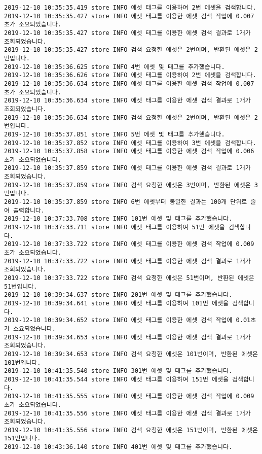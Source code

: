 \begin{Verbatim}[fontsize=\tiny, breaklines=true, breakanywhere=true]
2019-12-10 10:35:35.419 store INFO 에셋 태그를 이용하여 2번 에셋을 검색합니다.
2019-12-10 10:35:35.427 store INFO 에셋 태그를 이용한 에셋 검색 작업에 0.007초가 소요되었습니다.
2019-12-10 10:35:35.427 store INFO 에셋 태그를 이용한 에셋 검색 결과로 1개가 조회되었습니다.
2019-12-10 10:35:35.427 store INFO 검색 요청한 에셋은 2번이며, 반환된 에셋은 2번입니다.
2019-12-10 10:35:36.625 store INFO 4번 에셋 및 태그를 추가했습니다.
2019-12-10 10:35:36.626 store INFO 에셋 태그를 이용하여 2번 에셋을 검색합니다.
2019-12-10 10:35:36.634 store INFO 에셋 태그를 이용한 에셋 검색 작업에 0.007초가 소요되었습니다.
2019-12-10 10:35:36.634 store INFO 에셋 태그를 이용한 에셋 검색 결과로 1개가 조회되었습니다.
2019-12-10 10:35:36.634 store INFO 검색 요청한 에셋은 2번이며, 반환된 에셋은 2번입니다.
2019-12-10 10:35:37.851 store INFO 5번 에셋 및 태그를 추가했습니다.
2019-12-10 10:35:37.852 store INFO 에셋 태그를 이용하여 3번 에셋을 검색합니다.
2019-12-10 10:35:37.858 store INFO 에셋 태그를 이용한 에셋 검색 작업에 0.006초가 소요되었습니다.
2019-12-10 10:35:37.859 store INFO 에셋 태그를 이용한 에셋 검색 결과로 1개가 조회되었습니다.
2019-12-10 10:35:37.859 store INFO 검색 요청한 에셋은 3번이며, 반환된 에셋은 3번입니다.
2019-12-10 10:35:37.859 store INFO 6번 에셋부터 동일한 결과는 100개 단위로 줄여 출력합니다.
2019-12-10 10:37:33.708 store INFO 101번 에셋 및 태그를 추가했습니다.
2019-12-10 10:37:33.711 store INFO 에셋 태그를 이용하여 51번 에셋을 검색합니다.
2019-12-10 10:37:33.722 store INFO 에셋 태그를 이용한 에셋 검색 작업에 0.009초가 소요되었습니다.
2019-12-10 10:37:33.722 store INFO 에셋 태그를 이용한 에셋 검색 결과로 1개가 조회되었습니다.
2019-12-10 10:37:33.722 store INFO 검색 요청한 에셋은 51번이며, 반환된 에셋은 51번입니다.
2019-12-10 10:39:34.637 store INFO 201번 에셋 및 태그를 추가했습니다.
2019-12-10 10:39:34.641 store INFO 에셋 태그를 이용하여 101번 에셋을 검색합니다.
2019-12-10 10:39:34.652 store INFO 에셋 태그를 이용한 에셋 검색 작업에 0.01초가 소요되었습니다.
2019-12-10 10:39:34.653 store INFO 에셋 태그를 이용한 에셋 검색 결과로 1개가 조회되었습니다.
2019-12-10 10:39:34.653 store INFO 검색 요청한 에셋은 101번이며, 반환된 에셋은 101번입니다.
2019-12-10 10:41:35.540 store INFO 301번 에셋 및 태그를 추가했습니다.
2019-12-10 10:41:35.544 store INFO 에셋 태그를 이용하여 151번 에셋을 검색합니다.
2019-12-10 10:41:35.555 store INFO 에셋 태그를 이용한 에셋 검색 작업에 0.009초가 소요되었습니다.
2019-12-10 10:41:35.556 store INFO 에셋 태그를 이용한 에셋 검색 결과로 1개가 조회되었습니다.
2019-12-10 10:41:35.556 store INFO 검색 요청한 에셋은 151번이며, 반환된 에셋은 151번입니다.
2019-12-10 10:43:36.140 store INFO 401번 에셋 및 태그를 추가했습니다.

\end{Verbatim}
